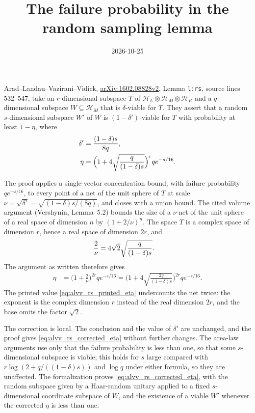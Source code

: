 \documentclass{article}
\title{The failure probability in the random sampling lemma}
\author{}
\date{2026-10-25}
\begin{document}
\maketitle
{}

Arad--Landau--Vazirani--Vidick,
\href{https://arxiv.org/abs/1602.08828}{arXiv:1602.08828v2}, Lemma
\texttt{l:rs}, source lines 532--547, take an $r$-dimensional subspace $T$
of $\mathcal H_L\otimes\mathcal H_M\otimes\mathcal H_R$ and a
$q$-dimensional subspace $W\subseteq\mathcal H_M$ that is $\delta$-viable
for $T$. They assert that a random $s$-dimensional subspace $W'$ of $W$ is
$(1-\delta')$-viable for $T$ with probability at least $1-\eta$, where
\begin{align}
    \delta'&=\frac{(1-\delta)s}{8q},\notag\\
    \eta&=\Big(1+4\sqrt{\frac{q}{(1-\delta)s}}\Big)^rqe^{-s/16}.
    \label{eq:alvv_rs_printed_eta}
\end{align}

The proof applies a single-vector concentration bound, with failure
probability $qe^{-s/16}$, to every point of a net of the unit sphere of $T$
at scale $\nu=\sqrt{\delta'}=\sqrt{(1-\delta)s/(8q)}$, and closes with a
union bound. The cited volume argument (Vershynin, Lemma~5.2) bounds the
size of a $\nu$-net of the unit sphere of a real space of dimension $n$ by
$(1+2/\nu)^n$. The space $T$ is a complex space of dimension $r$, hence a
real space of dimension $2r$, and
\begin{align}
    \frac{2}{\nu}&=4\sqrt2\sqrt{\frac{q}{(1-\delta)s}}.\notag
\end{align}
The argument as written therefore gives
\begin{align}
    \eta&=\Big(1+\frac2\nu\Big)^{2r}qe^{-s/16}
    =\Big(1+4\sqrt{\frac{2q}{(1-\delta)s}}\Big)^{2r}qe^{-s/16}.
    \label{eq:alvv_rs_corrected_eta}
\end{align}
The printed value \eqref{eq:alvv_rs_printed_eta} undercounts the net twice:
the exponent is the complex dimension $r$ instead of the real dimension $2r$,
and the base omits the factor $\sqrt2$.

The correction is local. The conclusion and the value of $\delta'$ are
unchanged, and the proof gives \eqref{eq:alvv_rs_corrected_eta} without
further changes. The area-law arguments use only that the failure
probability is less than one, so that some $s$-dimensional subspace is
viable; this holds for $s$ large compared with $r\log(2+q/((1-\delta)s))$ and
$\log q$ under either formula, so they are unaffected. The formalization
proves \eqref{eq:alvv_rs_corrected_eta}, with the random subspace given by
a Haar-random unitary applied to a fixed $s$-dimensional coordinate
subspace of $W$, and the existence of a viable $W'$ whenever the corrected
$\eta$ is less than one.
\end{document}
